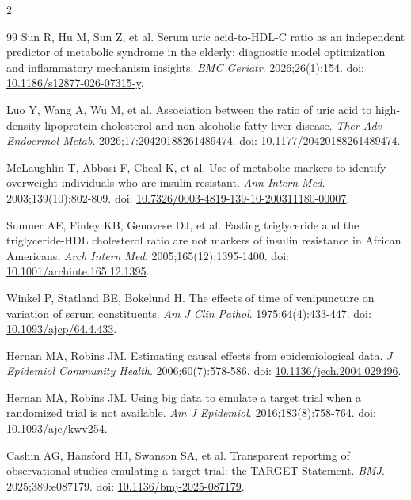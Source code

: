 \documentclass[10pt,letterpaper]{article}
\begin{document}
\begin{multicols}{2}
\begin{thebibliography}{99}
 Sun R, Hu M, Sun Z, et al. Serum uric acid-to-HDL-C ratio as an independent predictor of metabolic syndrome in the elderly: diagnostic model optimization and inflammatory mechanism insights. \textit{BMC Geriatr}. 2026;26(1):154. doi: \href{https://doi.org/10.1186/s12877-026-07315-y}{10.1186/s12877-026-07315-y}.

 Luo Y, Wang A, Wu M, et al. Association between the ratio of uric acid to high-density lipoprotein cholesterol and non-alcoholic fatty liver disease. \textit{Ther Adv Endocrinol Metab}. 2026;17:20420188261489474. doi: \href{https://doi.org/10.1177/20420188261489474}{10.1177/20420188261489474}.

 McLaughlin T, Abbasi F, Cheal K, et al. Use of metabolic markers to identify overweight individuals who are insulin resistant. \textit{Ann Intern Med}. 2003;139(10):802-809. doi: \href{https://doi.org/10.7326/0003-4819-139-10-200311180-00007}{10.7326/0003-4819-139-10-200311180-00007}.

 Sumner AE, Finley KB, Genovese DJ, et al. Fasting triglyceride and the triglyceride-HDL cholesterol ratio are not markers of insulin resistance in African Americans. \textit{Arch Intern Med}. 2005;165(12):1395-1400. doi: \href{https://doi.org/10.1001/archinte.165.12.1395}{10.1001/archinte.165.12.1395}.

 Winkel P, Statland BE, Bokelund H. The effects of time of venipuncture on variation of serum constituents. \textit{Am J Clin Pathol}. 1975;64(4):433-447. doi: \href{https://doi.org/10.1093/ajcp/64.4.433}{10.1093/ajcp/64.4.433}.

 Hernan MA, Robins JM. Estimating causal effects from epidemiological data. \textit{J Epidemiol Community Health}. 2006;60(7):578-586. doi: \href{https://doi.org/10.1136/jech.2004.029496}{10.1136/jech.2004.029496}.

 Hernan MA, Robins JM. Using big data to emulate a target trial when a randomized trial is not available. \textit{Am J Epidemiol}. 2016;183(8):758-764. doi: \href{https://doi.org/10.1093/aje/kwv254}{10.1093/aje/kwv254}.

 Cashin AG, Hansford HJ, Swanson SA, et al. Transparent reporting of observational studies emulating a target trial: the TARGET Statement. \textit{BMJ}. 2025;389:e087179. doi: \href{https://doi.org/10.1136/bmj-2025-087179}{10.1136/bmj-2025-087179}.


\end{thebibliography}
\end{multicols}
\end{document}
